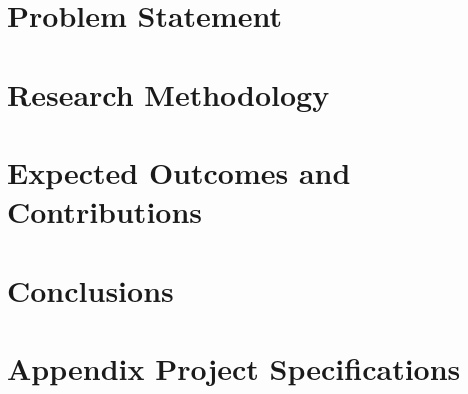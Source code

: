 \documentclass{scrartcl}
\begin{document}
\newpage

\section{Problem Statement}


\newpage

\section{Research Methodology}



\neapage

\section{Expected Outcomes and Contributions}


\newpage

\section{Conclusions}



\newpage
\singlespacing





\newpage

\appendix

\section{Appendix  Project Specifications}



% 
\end{document}
